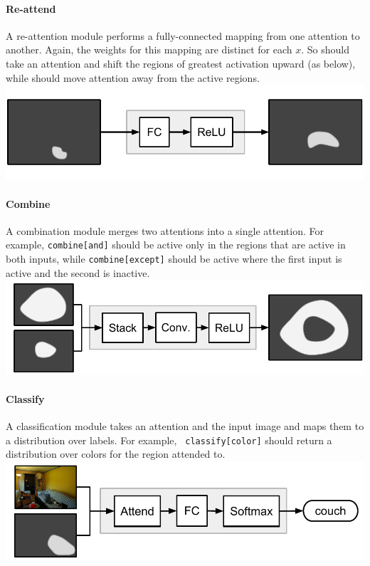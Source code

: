 \documentclass[10pt,twocolumn,letterpaper]{article}
\begin{document}
\paragraph{Re-attend}

A re-attention module  performs a fully-connected mapping
from one attention to another. Again, the weights for this mapping are distinct
for each $x$. So  should take an attention and shift the
regions of greatest activation upward (as below), while 
should move attention away from the active regions.\\%
\includegraphics[width=\columnwidth]{fig/re-attend}

\paragraph{Combine}

A combination module  merges two attentions into a single
attention. For example, {\small\tt combine[and]} should be active only in the
regions that are active in both inputs, while {\small\tt{combine[except]}}
should be active where the first input is active and the second is
inactive.\\[1em] 
\includegraphics[width=\columnwidth]{fig/combine}

\paragraph{Classify}

A classification module  takes an attention and the input
image and maps them to a distribution over labels. For example, {\small\tt
classify[color]} should return a distribution over colors for the region
attended to.\\[1em]
\includegraphics[width=\columnwidth]{fig/classify}
\end{document}
